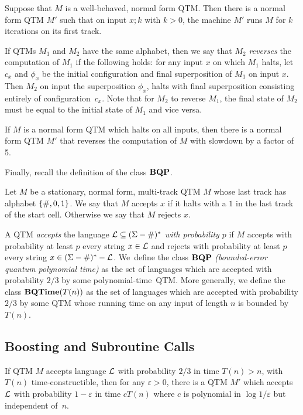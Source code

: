 \begin{lemma}
\label{looping}
Suppose that $M$ is a well-behaved, normal form QTM.
Then there is a normal form QTM $M'$ such that on input $x;k$ with
$k > 0$, the machine $M'$ runs $M$ for $k$ iterations on its first track.
\end{lemma}

\begin{definition}
If QTMs $M_1$ and $M_2$ have the same alphabet, then we say that $M_2$
{\em reverses\/} the computation of $M_1$ if the following holds:
for any input $x$ on which $M_1$ halts, let $c_x$ and $\phi_x$ be the initial
configuration and final superposition of $M_1$ on input $x$. Then
$M_2$ on input the superposition $\phi_x$, halts with
final superposition consisting entirely of configuration~$c_x$.
Note that for $M_2$ to reverse $M_1$, the final state of $M_2$ must
be equal to the initial state of $M_1$ and vice versa.
\end{definition}

\begin{lemma}
\label{reverse}
If $M$ is a normal form QTM which halts on all inputs,
then there is a normal form
QTM $M'$ that reverses the computation of $M$ with slowdown by a factor of 5.
\end{lemma}

Finally, recall the definition of the class $\mbox{\bf BQP}$.

\begin{definition}
Let $M$ be a stationary, normal form, multi-track QTM $M$ whose last track has
alphabet $\{{\#},0,1\}$. We say that $M$ accepts $x$ if it halts with a
$1$ in the last track of the start cell. Otherwise we say that $M$ rejects $x$.

A QTM {\em accepts\/} the language ${\cal L} \subseteq (\Sigma - {\#})^*$
{\em with probability $p$\/} if $M$ accepts with probability at least $p$ every
string $x \in {\cal L}$ and rejects with probability at least $p$ every string
\mbox{$x \in (\Sigma - {\#})^* - {\cal L}$}. We~define the class $\mbox{\bf BQP}$
{\em (bounded-error quantum polynomial time)\/} as the set of languages
which are accepted with probability $2/3$ by some polynomial-time~QTM.
More generally, we define the class $\mbox{\bf BQTime}(T(n))$ as the set of
languages which are \mbox{accepted} with probability $2/3$ by some QTM
whose running time on any input of length $n$ is bounded by $T(n)$.
\end{definition}

\subsection{Boosting and Subroutine Calls}
\begin{theorem}
\label{boost}
If QTM $M$ accepts language ${\cal L}$ with probability $2/3$ in time
$T(n) > n$, with $T(n)$ time-constructible,
then for any $\varepsilon > 0$, there is a QTM $M'$ which accepts ${\cal L}$
with probability $1 - \varepsilon$ in time $cT(n)$ where
$c$ is polynomial in $\log 1/\varepsilon$ but independent of~$n$.
\end{theorem}

